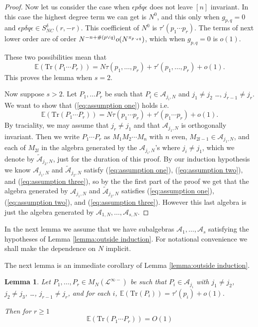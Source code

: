 \documentclass[11pt]{amsart}
\newtheorem{lemma}[theorem]{Lemma}
\theoremstyle{definition}
\numberwithin{theorem}{section}
\newcommand{\cA}{\mathcal{A}}
\newcommand{\cL}{\mathcal{L}}
\newcommand{\sN}{{\scriptscriptstyle N}}
\newcommand{\NC}{\mathit{NC}}
\newcommand{\peq}{{p \mskip 2mu\cdot_\epsilon q}}
\newcommand{\rE} {\mathbb{E}}
\newcommand{\Tr}{\mathrm{Tr}}
\begin{document}
\begin{proof}
Now let us consider the case when $\epsilon p \delta q
\epsilon$ does not leave $[n]$ invariant. In this case the
highest degree term we can get is $N^0$, and this only when
$g_{p,q} = 0$ and $\epsilon p \delta q \epsilon \in
S_\NC^\delta(r, -r)$. This coefficient of $N^0$ is
$\tau'(p_1 \cdots p_r)$. The terms of next lower order are
of order $N^{-n + \#(p \vee q)} o(N^{\pi_\peq})$, which when
$g_{p,q} = 0$ is $o(1)$.


These two possibilities mean that
\[
\rE(\Tr(P_1 \cdots P_r))
=
N \tau(p_1, \dots, p_r) + \tau'(p_1, \dots, p_r) + o(1).
\]
This proves the lemma when $s = 2$. 

Now suppose $s > 2$. Let $P_1, \dots P_r$ be such that $P_i
\in \cA_{j_i, \sN}$ and $j_1 \not = j_2$ \dots, $j_{r-1}
\not = j_r$. We want to show that (\ref{eq:assumption one})
holds i.e.
\[
\rE(\Tr(P_1 \cdots P_r)) = N \tau(p_1 \cdots p_r) + \tau'(p_1 \cdots p_r) +o(1).
\]
By traciality, we may assume that $j_r \not = j_1$ and that
$\cA_{j_1, \sN}$ is orthogonally invariant. Then we write
$P_1 \cdots P_r$ as $M_1 M_2 \cdots M_n$ with $n$ even,
$M_{2l-1} \in \cA_{j_1, \sN}$, and each of $M_{2l}$ in the
algebra generated by the $\cA_{j_i,\sN}$'s where $j_i \not =
j_1$, which we denote by $\tilde{\cA}_{j_2, \sN}$, just for
the duration of this proof. By our induction hypothesis we
know $\cA_{j_1, \sN}$ and $\tilde{\cA}_{j_2,\sN}$ satisfy
(\ref{eq:assumption one}), (\ref{eq:assumption two}), and
(\ref{eq:assumption three}), so by the the first part of the
proof we get that the algebra generated by $\cA_{j_1, \sN}$
and $\tilde{\cA}_{j_2, \sN}$ satisfies (\ref{eq:assumption
  one}), (\ref{eq:assumption two}), and (\ref{eq:assumption
  three}). However this last algebra is just the algebra
generated by $\cA_{1, \sN}, \dots, \cA_{s, \sN}$.
\end{proof}

In the next lemma we assume that we have subalgebras $\cA_1,
\dots, \cA_s$ satisfying the hypotheses of Lemma
\ref{lemma:outside induction}. For notational convenience we
shall make the dependence on $N$ implicit.

The next lemma is an immediate corollary of Lemma \ref{lemma:outside induction}. 

\begin{lemma}\label{lemma:first inside induction}
Let $P_1, \dots, P_r \in M_N(\cL^{\infty-})$ be such that
$P_i \in \cA_{j_i}$ with $j_1 \not= j_2$, $j_2 \not = j_3$,
\dots, $j_{r-1} \not = j_r$, and for each $i$,
$\rE(\Tr(P_i)) = \tau'(p_i) + o(1)$.

Then for $r \geq 1$
\begin{equation}\label{eq:first intermediate limit distribution}
\rE(\Tr(P_1 \cdots P_r))
= O(1)
\end{equation} 
\end{lemma}
\end{document}
